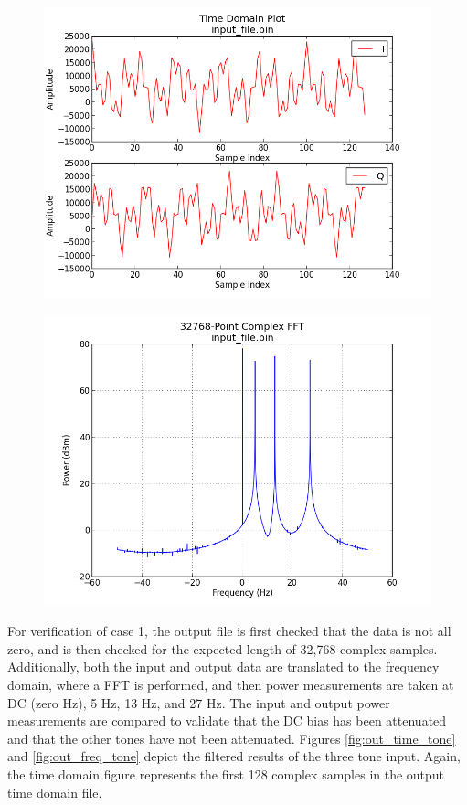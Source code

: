 \documentclass{article}
\begin{document}
\begin{figure}[ht]
	\centering
	\begin{minipage}{.5\textwidth}
		\centering\includegraphics[width=1.0\linewidth]{input_time_tones}
		\label{fig:in_time_tone}
	\end{minipage}%
	\begin{minipage}{.5\textwidth}
		\centering\includegraphics[width=1.0\linewidth]{input_freq_tones}
		\label{fig:in_freq_tone}
	\end{minipage}
\end{figure}

\noindent For verification of case 1, the output file is first checked that the data is not all zero, and is then checked for the expected length of 32,768 complex samples. Additionally, both the input and output data are translated to the frequency domain, where a FFT is performed, and then power measurements are taken at DC (zero Hz), 5 Hz, 13 Hz, and 27 Hz. The input and output power measurements are compared to validate that the DC bias has been attenuated and that the other tones have not been attenuated. Figures \ref{fig:out_time_tone} and \ref{fig:out_freq_tone} depict the filtered results of the three tone input. Again, the time domain figure represents the first 128 complex samples in the output time domain file.
\end{document}

